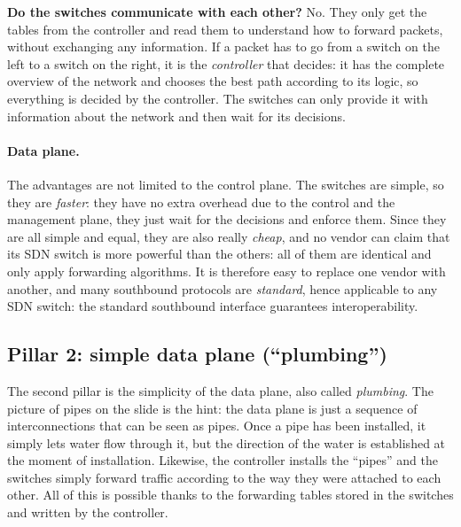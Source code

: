 \begin{notebox}
	\textbf{Do the switches communicate with each other?} No. They only get the tables from the controller and read them to understand how to forward packets, without exchanging any information. If a packet has to go from a switch on the left to a switch on the right, it is the \emph{controller} that decides: it has the complete overview of the network and chooses the best path according to its logic, so everything is decided by the controller. The switches can only provide it with information about the network and then wait for its decisions.
\end{notebox}

\paragraph{Data plane.} The advantages are not limited to the control plane. The switches are simple, so they are \emph{faster}: they have no extra overhead due to the control and the management plane, they just wait for the decisions and enforce them. Since they are all simple and equal, they are also really \emph{cheap}, and no vendor can claim that its SDN switch is more powerful than the others: all of them are identical and only apply forwarding algorithms. It is therefore easy to replace one vendor with another, and many southbound protocols are \emph{standard}, hence applicable to any SDN switch: the standard southbound interface guarantees interoperability.

\subsection{Pillar 2: simple data plane (``plumbing'')}

The second pillar is the simplicity of the data plane, also called \emph{plumbing}. The picture of pipes on the slide is the hint: the data plane is just a sequence of interconnections that can be seen as pipes. Once a pipe has been installed, it simply lets water flow through it, but the direction of the water is established at the moment of installation. Likewise, the controller installs the ``pipes'' and the switches simply forward traffic according to the way they were attached to each other. All of this is possible thanks to the forwarding tables stored in the switches and written by the controller.

\begin{center}
\end{center}

